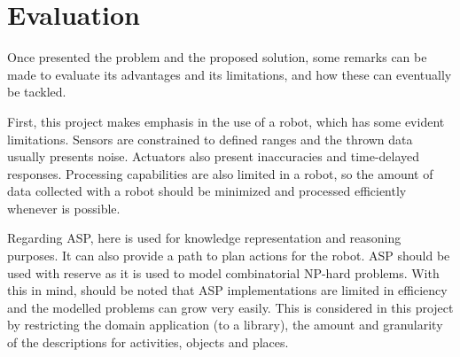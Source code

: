 

\section{Evaluation} %

Once presented the problem and the proposed solution, some remarks can be made to evaluate its advantages and its limitations, and how these can eventually be tackled.

First, this project makes emphasis in the use of a robot, which has some evident limitations.
Sensors are constrained to defined ranges and the thrown data usually presents noise.
Actuators also present inaccuracies and time-delayed responses.
Processing capabilities are also limited in a robot, so the amount of data collected with a robot should be minimized and processed efficiently whenever is possible.

Regarding ASP, here is used for knowledge representation and reasoning purposes. 
It can also provide a path to plan actions for the robot.
ASP should be used with reserve as it is used to model combinatorial NP-hard problems.
With this in mind, should be noted that ASP implementations are limited in efficiency and the modelled problems can grow very easily.
This is considered in this project by restricting the domain application (to a library), the amount and granularity of the descriptions for activities, objects and places.








